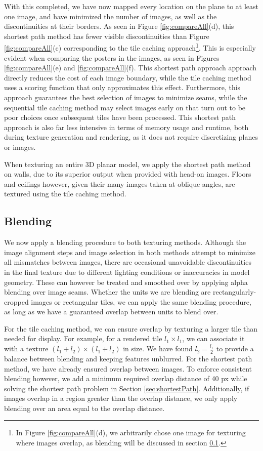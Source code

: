 \documentclass[]{spie}  %
\begin{document}
With this completed, we have now mapped every location on the plane to
at least one image, and have minimized the number of images, as well
as the discontinuities at their borders. As seen in Figure
\ref{fig:compareAll}(d), this shortest path method has fewer visible
discontinuities than Figure \ref{fig:compareAll}(c) corresponding to
the tile caching approach\footnote{In Figure \ref{fig:compareAll}(d),
  we arbitrarily chose one image for texturing where images overlap,
  as blending will be discussed in section \ref{sec:blending}.}. This
is especially evident when comparing the posters in the images, as
seen in Figures \ref{fig:compareAll}(e) and
\ref{fig:compareAll}(f). This shortest path approach approach directly
reduces the cost of each image boundary, while the tile caching method
uses a scoring function that only approximates this
effect. Furthermore, this approach guarantees the best selection of
images to minimize seams, while the sequential tile caching method may
select images early on that turn out to be poor choices once
subsequent tiles have been processed. This shortest path approach is
also far less intensive in terms of memory usage and runtime, both
during texture generation and rendering, as it does not require
discretizing planes or images.

When texturing an entire 3D planar model, we apply the shortest path
method on walls, due to its superior output when provided with head-on
images. Floors and ceilings however, given their many images taken at
oblique angles, are textured using the tile caching method.


\subsection{Blending}
\label{sec:blending}
We now apply a blending procedure to both texturing methods. Although
the image alignment steps and image selection in both methods attempt
to minimize all mismatches between images, there are occasional
unavoidable discontinuities in the final texture due to different
lighting conditions or inaccuracies in model geometry. These can
however be treated and smoothed over by applying alpha blending over
image seams.  Whether the units we are blending are
rectangularly-cropped images or rectangular tiles, we can apply the
same blending procedure, as long as we have a guaranteed overlap
between units to blend over.

For the tile caching method, we can ensure overlap by texturing a
larger tile than needed for display. For example, for a rendered tile
$l_1 \times l_1$, we can associate it with a texture $(l_1 + l_2)
\times (l_1 + l_2)$ in size.  We have found $l_2 = \frac{l_1}{2}$ to
provide a balance between blending and keeping features unblurred. For
the shortest path method, we have already ensured overlap between
images. To enforce consistent blending however, we add a minimum
required overlap distance of 40 px while solving the shortest path
problem in Section \ref{sec:shortestPath}. Additionally, if images
overlap in a region greater than the overlap distance, we only apply
blending over an area equal to the overlap distance.
\end{document}
